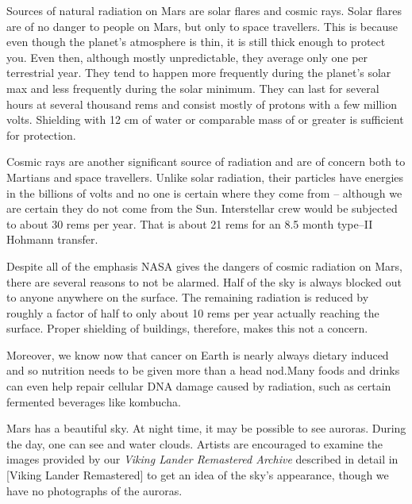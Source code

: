 Sources of natural radiation on Mars are solar flares and cosmic rays. Solar flares are of no danger to people on Mars, but only to space travellers. This is because even though the planet's atmosphere is thin, it is still thick enough to protect you. Even then, although mostly unpredictable, they average only one per terrestrial year. They tend to happen more frequently during the planet's solar max and less frequently during the solar minimum. They can last for several hours at several thousand rems and consist mostly of protons with a few million volts. Shielding with 12 cm of water or comparable mass of  or greater is sufficient for protection.

Cosmic rays are another significant source of radiation and are of concern both to Martians and space travellers. Unlike solar radiation, their particles have energies in the billions of volts and no one is certain where they come from -- although we are certain they do not come from the Sun. Interstellar crew would be subjected to about 30 rems per year. That is about 21 rems for an 8.5 month type--II Hohmann transfer.

Despite all of the emphasis NASA gives the dangers of cosmic radiation on Mars, there are several reasons to not be alarmed. Half of the sky is always blocked out to anyone anywhere on the surface. The remaining radiation is reduced by roughly a factor of half to only about 10 rems per year actually reaching the surface. Proper shielding of buildings, therefore, makes this not a concern.

Moreover, we know now that cancer on Earth is nearly always dietary induced and so nutrition needs to be given more than a head nod. Many foods and drinks can even help repair cellular DNA damage caused by radiation, such as certain fermented beverages like kombucha.\footnotecite[cavusoglu2009]

Mars has a beautiful sky. At night time, it may be possible to see auroras. During the day, one can see  and water clouds. Artists are encouraged to examine the images provided by our {\it Viking Lander Remastered Archive} described in detail in [Viking Lander Remastered] to get an idea of the sky's appearance, though we have no photographs of the auroras.

